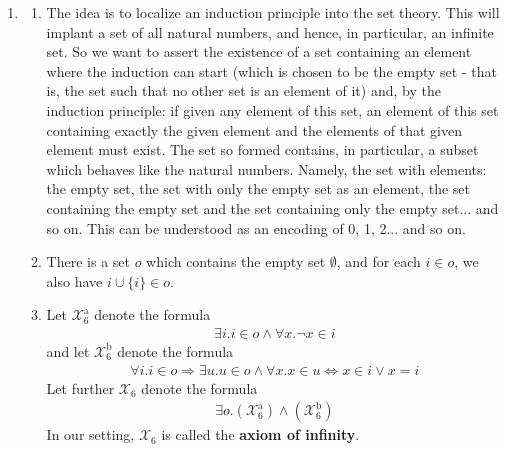 \begin{enumerate}
\begin{enumerate}
\begin{align*}
  \exists
  p
  .
  \forall
  a
  .
  \left(
    \forall
    x
    .
    x
    \in
    a
    \Rightarrow
    x
    \in
    s
  \right)
  \Rightarrow
  a
  \in
  p
\end{align*}
In our setting, $\mathcal{X}_{5}$ is called the \textbf{axiom of power set}.
\end{enumerate}
\item[(6)]
\begin{enumerate}
\item[$\bullet$]
The idea is to {\glqq}localize{\grqq} an induction principle into the set theory.
This will implant a set of all natural numbers, and hence, in particular, an infinite set.
So we want to assert the existence of a set containing an element where the induction can start (which is chosen to be the empty set - that is, the set such that no other set is an element of it) and, by the induction principle: if given any element of this set, an element of this set containing exactly the given element and the elements of that given element must exist.
The set so formed contains, in particular, a subset which behaves like the natural numbers.
Namely, the set with elements: the empty set, the set with only the empty set as an element, the set containing the empty set and the set containing only the empty set... and so on.
This can be understood as an encoding of 0, 1, 2... and so on.
\item[$\bullet$]
There is a set $o$ which contains the empty set $\emptyset$, and for each $i \in o$, we also have $i \cup \lbrace i \rbrace \in o$.
\item[$\bullet$]
Let $\mathcal{X}_{6}^{\textrm{a}}$ denote the formula
\begin{align*}
  \exists
  i
  .
  i
  \in
  o
  \land
  \forall
  x
  .
  \neg
  x
  \in
  i
\end{align*}
and let $\mathcal{X}_{6}^{\textrm{b}}$ denote the formula
\begin{align*}
  \forall
  i
  .
  i
  \in
  o
  \Rightarrow
  \exists
  u
  .
  u
  \in
  o
  \land
  \forall
  x
  .
  x
  \in
  u
  \Leftrightarrow
  x
  \in
  i
  \lor
  x
  =
  i
\end{align*}
Let further $\mathcal{X}_{6}$ denote the formula
\begin{align*}
  \exists
  o
  .
  (\mathcal{X}_{6}^{\textrm{a}})
  \land
  (\mathcal{X}_{6}^{\textrm{b}})
\end{align*}
In our setting, $\mathcal{X}_{6}$ is called the \textbf{axiom of infinity}.

\end{enumerate}
\end{enumerate}
